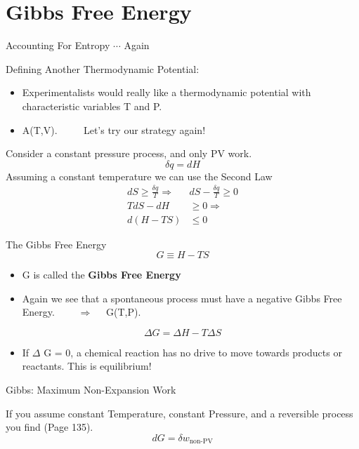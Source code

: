 \documentclass[t,10pt,mathserif,xcolor=pst,pdftex]{beamer}
\newcommand{\be}{\begin{equation}}
\newcommand{\ee}{\end{equation}}
\begin{document}
\section{Gibbs Free Energy}

\begin{frame}{Accounting For Entropy $\cdots$ Again}

{\Large{Defining Another Thermodynamic Potential:}} 
\newline
\begin{itemize}
\item Experimentalists would really like a thermodynamic potential with characteristic variables T and P.
\item A(T,V). $\qquad$ Let's try our strategy again!
\end{itemize}

Consider a constant pressure process, and only PV work.  
\begin{equation}
    \delta q = dH 
\end{equation}
Assuming a constant temperature we can use the Second Law
\be
\begin{split}
dS \geq \frac{\delta q}{T} \Rightarrow &dS - \frac{\delta q}{T} \geq 0\\
TdS - dH &\geq 0 \Rightarrow \\
d(H-TS) &\leq 0
\end{split}
\ee

\end{frame}

\begin{frame}{The Gibbs Free Energy}
\be
G \equiv H - TS
\ee

\begin{itemize}
\item G is called the \textbf{Gibbs Free Energy}
\end{itemize}

\begin{itemize}
\item Again we see that a spontaneous process must have a negative Gibbs Free Energy.  $\qquad \Rightarrow \quad$ G(T,P). 
\end{itemize}

\be
\Delta G = \Delta H - T\Delta S
\ee

\begin{itemize}
\item  If $\Delta$ G = 0, a chemical reaction has no drive to move towards products or reactants. This is equilibrium!
\end{itemize}

{\large{Gibbs: Maximum Non-Expansion Work}}

If you assume constant Temperature, constant Pressure, and a reversible process you find (Page 135).
\be
dG = \delta w_{\text{non-PV}}
\ee

\end{frame}
\end{document}
